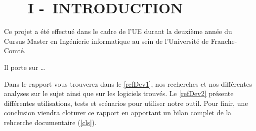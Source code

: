 \chapter[~~~INTRODUCTION]{~~~I -~INTRODUCTION} 

Ce projet a été effectué dans le cadre de l'UE  durant la deuxième année du Cursus Master en Ingénierie informatique au sein de l'Université de Franche-Comté.
\bigskip

Il porte sur \dots
\bigskip

Dans le rapport vous trouverez dans le \autoref{refDev1}, nos recherches et nos différentes analyses sur le sujet ainsi que sur les logiciels trouvés. 
Le \autoref{refDev2} présente différentes utilisations, tests et scénarios pour utiliser notre outil.
Pour finir, une conclusion viendra cloturer ce rapport en apportant un bilan complet de la rehcerche documentaire (\autoref{cls}).
